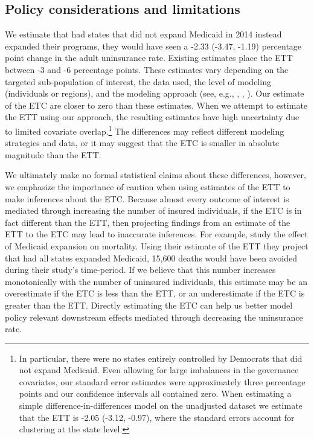 \documentclass[aoas]{imsart}
\theoremstyle{plain}
\theoremstyle{remark}
\begin{document}
\subsection{Policy considerations and limitations}

We estimate that had states that did not expand Medicaid in 2014 instead expanded their programs, they would have seen a -2.33 (-3.47, -1.19) percentage point change in the adult uninsurance rate. Existing estimates place the ETT between -3 and -6 percentage points. These estimates vary depending on the targeted sub-population of interest, the data used, the level of modeling (individuals or regions), and the modeling approach (see, e.g., \cite{courtemanche2017early}, \cite{kaestner2017effects}, \cite{frean2017premium}). Our estimate of the ETC are closer to zero than these estimates. When we attempt to estimate the ETT using our approach, the resulting estimates have high uncertainty due to limited covariate overlap.\footnote{In particular, there were no states entirely controlled by Democrats that did not expand Medicaid. Even allowing for large imbalances in the governance covariates, our standard error estimates were approximately three percentage points and our confidence intervals all contained zero. When estimating a simple difference-in-differences model on the unadjusted dataset we estimate that the ETT is -2.05 (-3.12, -0.97), where the standard errors account for clustering at the state level.} The differences may reflect different modeling strategies and data, or it may suggest that the ETC is smaller in absolute magnitude than the ETT.

We ultimately make no formal statistical claims about these differences, however, we emphasize the importance of caution when using estimates of the ETT to make inferences about the ETC. Because almost every outcome of interest is mediated through increasing the number of insured individuals, if the ETC is in fact different than the ETT, then projecting findings from an estimate of the ETT to the ETC may lead to inaccurate inferences. For example, \cite{miller2019medicaid} study the effect of Medicaid expansion on mortality. Using their estimate of the ETT they project that had all states expanded Medicaid, 15,600 deaths would have been avoided during their study's time-period. If we believe that this number increases monotonically with the number of uninsured individuals, this estimate may be an overestimate if the ETC is less than the ETT, or an underestimate if the ETC is greater than the ETT. Directly estimating the ETC can help us better model policy relevant downstream effects mediated through decreasing the uninsurance rate. 
\end{document}
